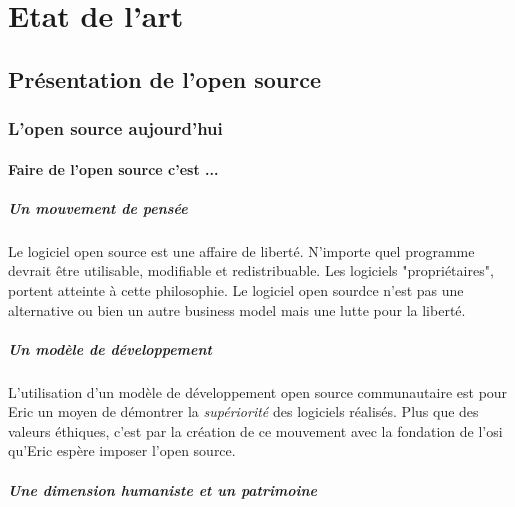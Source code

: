\chapter{Etat de l'art} %


	\section{Présentation de l'open source} %

		\subsection{L'open source aujourd'hui}

			\subsubsection{Faire de l'open source c'est ...}

				\paragraph{Un mouvement de pensée\\}

					Le logiciel open source est une affaire de liberté. N'importe quel programme devrait être utilisable, modifiable et redistribuable. Les logiciels "propriétaires", portent atteinte à cette philosophie. Le logiciel open sourdce n'est pas une alternative ou bien un autre business model mais une lutte pour la liberté.

				\paragraph{Un modèle de développement\\}

					L'utilisation d'un modèle de développement open source communautaire est pour Eric  un moyen de démontrer la \textit{supériorité} des logiciels réalisés. Plus que des valeurs éthiques, c'est par la création de ce mouvement avec la fondation de l'\acrshort{osi} qu'Eric  espère imposer l'open source.

				\paragraph{Une dimension humaniste et un patrimoine\\}

